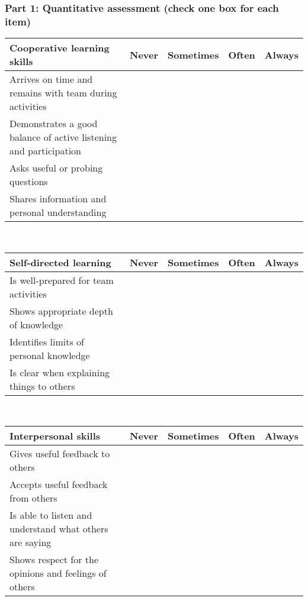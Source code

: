 \documentclass[11pt]{article}
\begin{document}
\subsubsection*{Part 1: Quantitative assessment (check one box for each item)}
\begin{flushleft}
\begin{tabular}{| p{6cm} | l | l | l | l |}
\hline
\textbf{Cooperative learning skills}&					Never & Sometimes & Often & Always \\	
\hline
Arrives on time and remains with team during activities	&&&&			\\	
\hline
Demonstrates a good balance of active listening and participation			&&&&			\\	
\hline
Asks useful or probing questions			&&&&			\\
\hline
Shares information and personal understanding				&&&&			\\	
\hline
\end{tabular}\\
\vskip 12pt
	
\noindent \begin{tabular}{| p{6cm} | l | l | l | l |}
\hline	
\textbf{Self-directed learning} &					Never & Sometimes & Often & Always \\	
\hline
Is well-prepared for team activities&&&&			\\	
\hline
Shows appropriate depth of knowledge	&&&&			\\
\hline	
Identifies limits of personal knowledge	&&&&			\\	
\hline
Is clear when explaining things to others		&&&&			\\	
\hline		
\end{tabular}\\

	\vskip 12pt			
\noindent \begin{tabular}{| p{6cm} | l | l | l | l |}
\hline	
\textbf{Interpersonal skills} &					Never & Sometimes & Often & Always \\	
\hline
Gives useful feedback to others			&&&&			\\			
\hline
Accepts useful feedback from others			&&&&			\\			
\hline
Is able to listen and understand what others are saying		&&&&			\\				
\hline
Shows respect for the opinions and feelings of others		&&&&			\\				
\hline
\end{tabular}

\end{flushleft}
\end{document}
